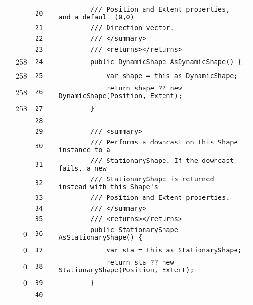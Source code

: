 \documentclass[a4paper,landscape,10pt]{article}
\begin{document}
\begin{longtable}[l]{lrrll}
\cellcolor{gray} &  & \verb~20~ & & \verb~        /// Position and Extent properties, and a default (0,0)~\\
\cellcolor{gray} &  & \verb~21~ & & \verb~        /// Direction vector.~\\
\cellcolor{gray} &  & \verb~22~ & & \verb~        /// </summary>~\\
\cellcolor{gray} &  & \verb~23~ & & \verb~        /// <returns></returns>~\\
\cellcolor{green} & 258 & \verb~24~ & & \verb~        public DynamicShape AsDynamicShape() {~\\
\cellcolor{green} & 258 & \verb~25~ & & \verb~            var shape = this as DynamicShape;~\\
\cellcolor{orange} & 258 & \verb~26~ & & \verb~            return shape ?? new DynamicShape(Position, Extent);~\\
\cellcolor{green} & 258 & \verb~27~ & & \verb~        }~\\
\cellcolor{gray} &  & \verb~28~ & & \verb~~\\
\cellcolor{gray} &  & \verb~29~ & & \verb~        /// <summary>~\\
\cellcolor{gray} &  & \verb~30~ & & \verb~        /// Performs a downcast on this Shape instance to a~\\
\cellcolor{gray} &  & \verb~31~ & & \verb~        /// StationaryShape. If the downcast fails, a new~\\
\cellcolor{gray} &  & \verb~32~ & & \verb~        /// StationaryShape is returned instead with this Shape's~\\
\cellcolor{gray} &  & \verb~33~ & & \verb~        /// Position and Extent properties.~\\
\cellcolor{gray} &  & \verb~34~ & & \verb~        /// </summary>~\\
\cellcolor{gray} &  & \verb~35~ & & \verb~        /// <returns></returns>~\\
\cellcolor{red} & 0 & \verb~36~ & & \verb~        public StationaryShape AsStationaryShape() {~\\
\cellcolor{red} & 0 & \verb~37~ & & \verb~            var sta = this as StationaryShape;~\\
\cellcolor{red} & 0 & \verb~38~ & & \verb~            return sta ?? new StationaryShape(Position, Extent);~\\
\cellcolor{red} & 0 & \verb~39~ & & \verb~        }~\\
\cellcolor{gray} &  & \verb~40~ & & \verb~~\\

\end{longtable}
\end{document}
